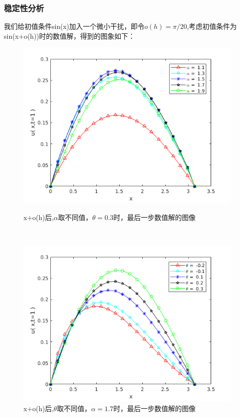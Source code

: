 \documentclass[notheorems,serif]{beamer}
\begin{document}
\begin{frame}
\frametitle{稳定性分析}
我们给初值条件sin(x)加入一个微小干扰，即令$o(h)=\pi/20$,考虑初值条件为sin(x+o(h))时的数值解，得到的图象如下：
\begin{figure}[h]
	\begin{minipage}[t]{0.4\linewidth}%
		\centering     %
		\includegraphics[width=1.2\textwidth]{alpha+o.png}
		\caption{x+o(h)后,$\alpha$取不同值，$\theta=0.3$时，最后一步数值解的图像}%
		\label{fig:liuchengtu1}%
	\end{minipage} 
	\hfill
	\begin{minipage}[t]{0.4\linewidth}
		\centering
		\includegraphics[width=1.2\textwidth]{theta+o.png}
		\caption{x+o(h)后,$\theta$取不同值，$\alpha=1.7$时，最后一步数值解的图像}%
		\label{fig:liuchengtu2}
	\end{minipage}
\end{figure}
\end{frame}
\end{document}
